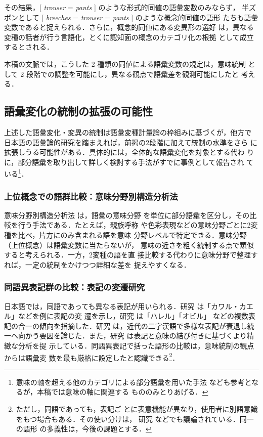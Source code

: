\documentclass[submit]{ipsj}
\begin{document}
その結果，[ \emph{trouser} = \emph{pants} ] のような形式的同値の語彙変数のみならず，
半ズボンとして [ \emph{breeches} = \emph{trouser} = \emph{pants} ] のような概念的同値の語形
たちも語彙変数であると捉えられる．さらに，概念的同値にある変異形の選好
は，異なる変種の話者が行う言語化，とくに認知面の概念のカテゴリ化の根拠
として成立するとされる\cite{DePascale2019Tokenbased}．

本稿の文脈では，こうした 2 種類の同値による語彙変数の規定は，意味統制
として 2 段階での調整を可能にし，異なる観点で語彙差を観測可能にしたと
考える．
\subsection{語彙変化の統制の拡張の可能性\label{org489a482}}
\label{sec:org4e02651}
上述した語彙変化・変異の統制は語彙変種計量論の枠組みに基づくが，他方で
日本語の語彙論的研究を踏まえれば，前掲の2段階に加えて統制の水準をさら
に拡張しうる可能性がある．具体的には，全体的な語彙変化を対象とする代わ
りに，部分語彙を取り出して詳しく検討する手法がすでに事例として報告され
ている\footnote{意味の軸を超える他のカテゴリによる部分語彙を用いた手法
\cite{ito2008Goi} なども参考となるが，本稿では意味の軸に関連する
もののみとりあげる．}．
\subsubsection{上位概念での語群比較：意味分野別構造分析法}
\label{sec:org91f1cef}
意味分野別構造分析法 \cite{tajima2000Goikenkyu} は，語彙の意味分野
を単位に部分語彙を区分し，その比較を行う手法である．たとえば，親族呼称
や色彩表現などの意味分野ごとに2変種を比べ，片方にのみ含まれる語を意味
分野レベルで特定できる．意味分野（上位概念）は語彙変数に当たらないが，
意味の近さを粗く統制する点で類似すると考えられる．一方，2変種の語を直
接比較する代わりに意味分野で整理すれば，一定の統制をかけつつ詳細な差を
捉えやすくなる．
\subsubsection{同語異表記群の比較：表記の変遷研究}
\label{sec:orgf24a73e}
日本語では，同語であっても異なる表記が用いられる．研究
\cite{takahashi2019Kindai} は「カワル・カエル」などを例に表記の変
遷を示し，研究 \cite{takahashi2016Kindai} は「ハレル」「オビル」
などの複数表記の合一の傾向を指摘した．研究
\cite{mabuchi2016Kindai} は，近代の二字漢語で多様な表記が衰退し統
一へ向かう要因を論じた．また，研究 \cite{takahashi2016Kindai,takahashi2019Kindai} は表記と意味の結び付きに基づくより精緻な分析を提
示している．同語異表記で括った語形の比較は，意味統制の観点からは語彙変
数を最も厳格に設定したと認識できる\footnote{ただし，同語であっても，表記ご
とに表意機能が異なり，使用者に別語意識をもつ場合もある．その使い分けは，
研究 \cite{takahashi2025Tango} などでも議論されている．同一の語形
の多義性は，今後の課題とする．}．
\end{document}
